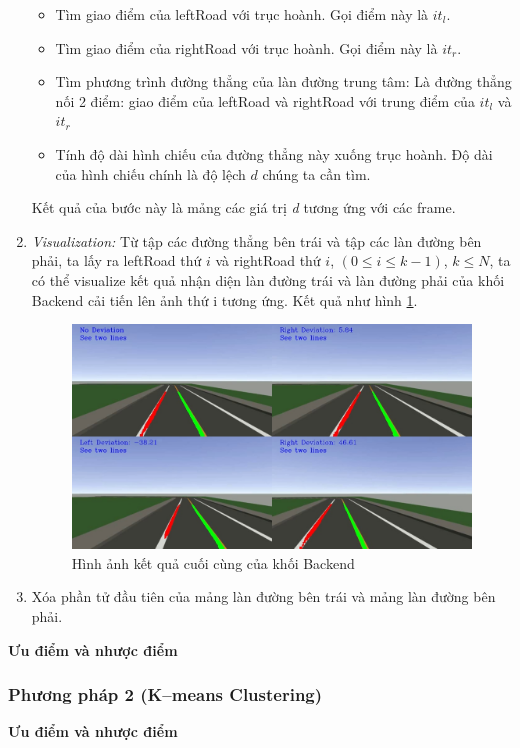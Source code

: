 \begin{enumerate}
    \begin{itemize}
        \item Tìm giao điểm của leftRoad với trục hoành. Gọi điểm này là $it_{l}$.
        \item Tìm giao điểm của rightRoad với trục hoành. Gọi điểm này là $it_{r}$.
        \item Tìm phương trình đường thẳng của làn đường trung tâm: Là đường thẳng nối 2 điểm: giao điểm của leftRoad và rightRoad với trung điểm của $it_{l}$ và $it_{r}$
        \item Tính độ dài hình chiếu của đường thẳng này xuống trục hoành. Độ dài của hình chiếu chính là độ lệch $d$ chúng ta cần tìm.
    \end{itemize}
    Kết quả của bước này là mảng các giá trị \textit{d} tương ứng với các frame.
    \item \textit{Visualization:} Từ tập các đường thẳng bên trái và tập các làn đường bên phải, ta lấy ra leftRoad thứ $i$ và rightRoad thứ $i$, $(0 \leq i \leq k-1)$, $k \leq N$, ta có thể visualize kết quả nhận diện làn đường trái và làn đường phải của khối Backend cải tiến lên ảnh thứ i tương ứng. Kết quả như hình \ref{final_result_of_BE}.
    \begin{figure}[h]
        \centering
        \includegraphics[width=12cm]{img/4_Implement/backend/ressult.jpg}
        \caption{Hình ảnh kết quả cuối cùng của khối Backend}
        \label{final_result_of_BE}
    \end{figure}
    \item Xóa phần tử đầu tiên của mảng làn đường bên trái và mảng làn đường bên phải.
\end{enumerate}
\textbf{Ưu điểm và nhược điểm}
\subsubsection{Phương pháp 2 (K–means Clustering)}
\textbf{Ưu điểm và nhược điểm}

